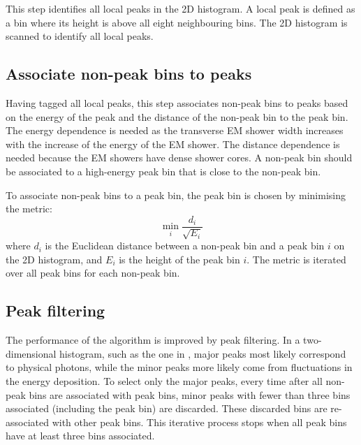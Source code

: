 This step identifies all local peaks in the 2D histogram. A local peak is defined as a bin where its height is above all eight neighbouring bins. The 2D histogram is scanned to identify all local peaks. %
\subsection{Associate non-peak bins to peaks}

Having tagged all local peaks, this step associates non-peak bins to peaks based on the energy of the peak and the distance of the non-peak bin to the peak bin. The energy dependence is needed as the transverse EM shower width increases with the increase of the energy of the EM shower. The distance dependence is needed because the EM showers have dense shower cores. A non-peak bin should be associated to a high-energy peak bin that is close to the non-peak bin.

To associate non-peak bins to a peak bin, the peak bin is chosen by minimising the metric:
\begin{equation}
\min_{i}\frac{d_{i}}{\sqrt{E_{i}}}
\end{equation}
where $d_{i}$ is the Euclidean distance between a non-peak bin and a  peak bin $i$ on the 2D histogram, and $E_{i}$ is the height of the peak bin $i$. The metric is iterated over all peak bins for each non-peak bin. %


\subsection{Peak filtering}

The performance of the \peakFinding algorithm is improved by peak filtering. In a two-dimensional histogram, such as the one in , major peaks most likely correspond to physical photons, while the minor peaks more likely come from fluctuations in the energy deposition. To select only the major peaks, every time after all non-peak bins are associated with peak bins, minor peaks with fewer than three bins associated (including the peak bin) are discarded. These discarded bins are re-associated with other peak bins. This iterative process stops when all peak bins have at least three bins associated.

